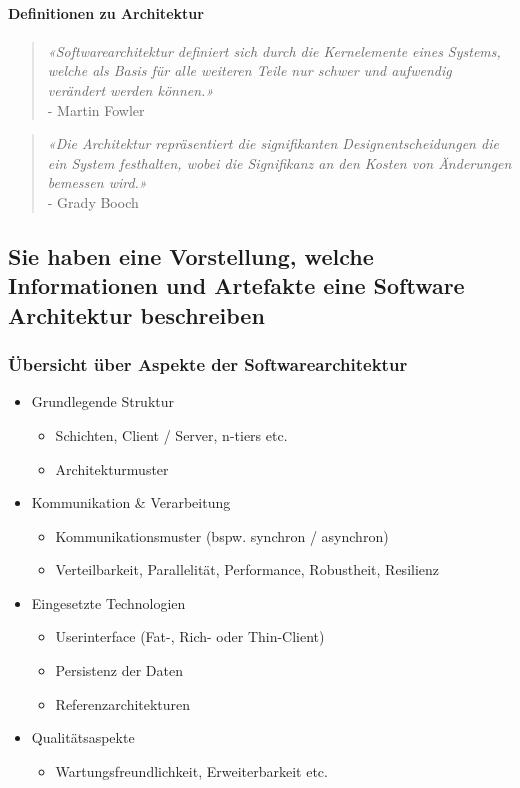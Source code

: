 \documentclass[a4paper]{article}
\begin{document}
			\paragraph{Definitionen zu Architektur}
			
				\begin{quote}
					\textit{«Softwarearchitektur definiert sich durch die Kernelemente eines Systems, welche als Basis für alle weiteren Teile nur schwer und aufwendig verändert werden können.»}\\
					- Martin Fowler
				\end{quote}
				\begin{quote}
					\textit{«Die Architektur repräsentiert die signifikanten Designentscheidungen die ein System festhalten, wobei die Signifikanz an den Kosten von Änderungen bemessen wird.»}\\
					- Grady Booch
				\end{quote}
			
		\subsection{Sie haben eine Vorstellung, welche Informationen und Artefakte eine Software Architektur beschreiben}
		
			\subsubsection{Übersicht über Aspekte der Softwarearchitektur}
			
				\begin{itemize}
					\item Grundlegende Struktur
					\begin{itemize}
						\item Schichten, Client / Server, n-tiers etc.
						\item Architekturmuster
					\end{itemize}
					\item Kommunikation \& Verarbeitung
					\begin{itemize}
						\item Kommunikationsmuster (bspw. synchron / asynchron)
						\item Verteilbarkeit, Parallelität, Performance, Robustheit, Resilienz
					\end{itemize}
					\item Eingesetzte Technologien
					\begin{itemize}
						\item Userinterface (Fat-, Rich- oder Thin-Client)
						\item Persistenz der Daten
						\item Referenzarchitekturen
					\end{itemize}
					\item Qualitätsaspekte
					\begin{itemize}
						\item Wartungsfreundlichkeit, Erweiterbarkeit etc.
					\end{itemize}
				\end{itemize}
			
\end{document}
